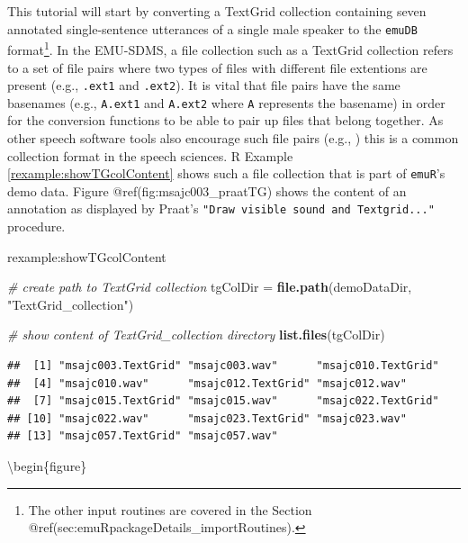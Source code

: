\documentclass[]{book}
\newenvironment{Shaded}{\begin{snugshade}}{\end{snugshade}}
\newcommand{\CommentTok}[1]{\textcolor[rgb]{0.56,0.35,0.01}{\textit{#1}}}
\newcommand{\KeywordTok}[1]{\textcolor[rgb]{0.13,0.29,0.53}{\textbf{#1}}}
\newcommand{\NormalTok}[1]{#1}
\newcommand{\StringTok}[1]{\textcolor[rgb]{0.31,0.60,0.02}{#1}}
\let\rmarkdownfootnote\footnote%
\def\footnote{\protect\rmarkdownfootnote}
\theoremstyle{definition}
\theoremstyle{definition}
\theoremstyle{definition}
\theoremstyle{remark}
\begin{document}
This tutorial will start by converting a TextGrid collection containing
seven annotated single-sentence utterances of a single male speaker to
the \texttt{emuDB} format\footnote{The other input routines are covered
  in the Section @ref(sec:emuRpackageDetails\_importRoutines).}. In the
EMU-SDMS, a file collection such as a TextGrid collection refers to a
set of file pairs where two types of files with different file
extentions are present (e.g., \texttt{.ext1} and \texttt{.ext2}). It is
vital that file pairs have the same basenames (e.g., \texttt{A.ext1} and
\texttt{A.ext2} where \texttt{A} represents the basename) in order for
the conversion functions to be able to pair up files that belong
together. As other speech software tools also encourage such file pairs
(e.g., \citet{kisler:2015a}) this is a common collection format in the
speech sciences. R Example \ref{rexample:showTGcolContent} shows such a
file collection that is part of \texttt{emuR}'s demo data. Figure
@ref(fig:msajc003\_praatTG) shows the content of an annotation as
displayed by Praat's \texttt{"Draw\ visible\ sound\ and\ Textgrid..."}
procedure.

rexample:showTGcolContent

\begin{Shaded}
\begin{Highlighting}[]
\CommentTok{# create path to TextGrid collection}
\NormalTok{tgColDir =}\StringTok{ }\KeywordTok{file.path}\NormalTok{(demoDataDir, }\StringTok{"TextGrid_collection"}\NormalTok{)}

\CommentTok{# show content of TextGrid_collection directory}
\KeywordTok{list.files}\NormalTok{(tgColDir)}
\end{Highlighting}
\end{Shaded}

\begin{verbatim}
##  [1] "msajc003.TextGrid" "msajc003.wav"      "msajc010.TextGrid"
##  [4] "msajc010.wav"      "msajc012.TextGrid" "msajc012.wav"     
##  [7] "msajc015.TextGrid" "msajc015.wav"      "msajc022.TextGrid"
## [10] "msajc022.wav"      "msajc023.TextGrid" "msajc023.wav"     
## [13] "msajc057.TextGrid" "msajc057.wav"
\end{verbatim}

\textbackslash{}begin\{figure\}
\end{document}
